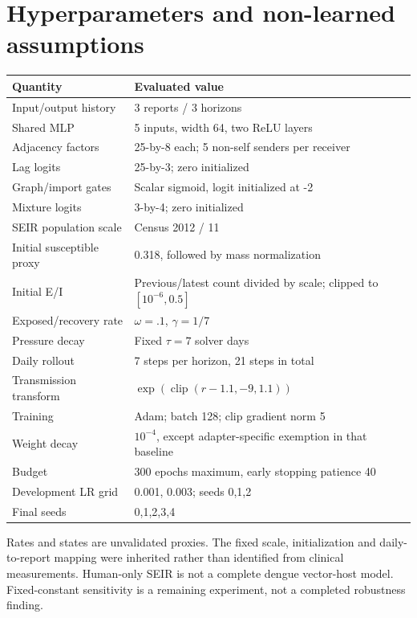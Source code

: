 \documentclass[11pt]{article}
\begin{document}
\section{Hyperparameters and non-learned assumptions}
\begin{center}\begin{tabular}{ll}\toprule Quantity & Evaluated value\\\midrule
Input/output history &3 reports / 3 horizons\\
Shared MLP &5 inputs, width 64, two ReLU layers\\
Adjacency factors &25-by-8 each; 5 non-self senders per receiver\\
Lag logits &25-by-3; zero initialized\\
Graph/import gates &Scalar sigmoid, logit initialized at -2\\
Mixture logits &3-by-4; zero initialized\\
SEIR population scale &Census 2012 / 11\\
Initial susceptible proxy &0.318, followed by mass normalization\\
Initial E/I &Previous/latest count divided by scale; clipped to $[10^{-6},0.5]$\\
Exposed/recovery rate &$\omega=.1$, $\gamma=1/7$\\
Pressure decay &Fixed $\tau=7$ solver days\\
Daily rollout &7 steps per horizon, 21 steps in total\\
Transmission transform &$\exp(\operatorname{clip}(r-1.1,-9,1.1))$\\
Training &Adam; batch 128; clip gradient norm 5\\
Weight decay &$10^{-4}$, except adapter-specific exemption in that baseline\\
Budget &300 epochs maximum, early stopping patience 40\\
Development LR grid &0.001, 0.003; seeds 0,1,2\\
Final seeds &0,1,2,3,4\\\bottomrule\end{tabular}\end{center}
Rates and states are unvalidated proxies. The fixed scale, initialization and daily-to-report mapping were inherited rather than identified from clinical measurements. Human-only SEIR is not a complete dengue vector-host model. Fixed-constant sensitivity is a remaining experiment, not a completed robustness finding.
\end{document}
